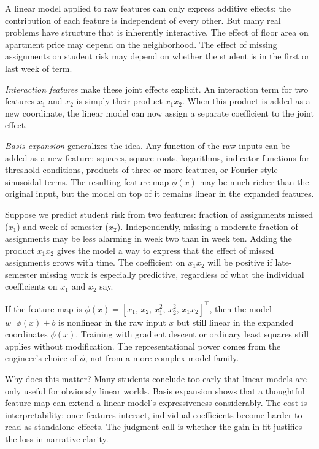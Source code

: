 A linear model applied to raw features can only express additive effects: the contribution of each feature is independent of every other. But many real problems have structure that is inherently interactive. The effect of floor area on apartment price may depend on the neighborhood. The effect of missing assignments on student risk may depend on whether the student is in the first or last week of term.

\emph{Interaction features} make these joint effects explicit. An interaction term for two features $x_1$ and $x_2$ is simply their product $x_1 x_2$. When this product is added as a new coordinate, the linear model can now assign a separate coefficient to the joint effect.

\emph{Basis expansion} generalizes the idea. Any function of the raw inputs can be added as a new feature: squares, square roots, logarithms, indicator functions for threshold conditions, products of three or more features, or Fourier-style sinusoidal terms. The resulting feature map $\phi(x)$ may be much richer than the original input, but the model on top of it remains linear in the expanded features.

\begin{example}
Suppose we predict student risk from two features: fraction of assignments missed ($x_1$) and week of semester ($x_2$). Independently, missing a moderate fraction of assignments may be less alarming in week two than in week ten. Adding the product $x_1 x_2$ gives the model a way to express that the effect of missed assignments grows with time. The coefficient on $x_1 x_2$ will be positive if late-semester missing work is especially predictive, regardless of what the individual coefficients on $x_1$ and $x_2$ say.
\end{example}

\begin{mathlens}
If the feature map is $\phi(x) = [x_1,\, x_2,\, x_1^2,\, x_2^2,\, x_1 x_2]^\top$, then the model $w^\top \phi(x) + b$ is nonlinear in the raw input $x$ but still linear in the expanded coordinates $\phi(x)$. Training with gradient descent or ordinary least squares still applies without modification. The representational power comes from the engineer's choice of $\phi$, not from a more complex model family.
\end{mathlens}

Why does this matter? Many students conclude too early that linear models are only useful for obviously linear worlds. Basis expansion shows that a thoughtful feature map can extend a linear model's expressiveness considerably. The cost is interpretability: once features interact, individual coefficients become harder to read as standalone effects. The judgment call is whether the gain in fit justifies the loss in narrative clarity.

